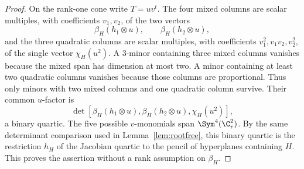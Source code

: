 \begin{proof}
On the rank-one cone write \(T=uv^t\).  The four mixed columns are
scalar multiples, with coefficients \(v_1,v_2\), of the two vectors
\[
 \beta_H(h_1\otimes u),\qquad
 \beta_H(h_2\otimes u),
\]
and the three quadratic columns are scalar multiples, with
coefficients \(v_1^2,v_1v_2,v_2^2\), of the single vector
\(\chi_H(u^2)\).  A \(3\)-minor containing three mixed columns
vanishes because the mixed span has dimension at most two.  A minor
containing at least two quadratic columns vanishes because those
columns are proportional.  Thus only minors with two mixed columns
and one quadratic column survive.  Their common \(u\)-factor is
\[
 \det[
   \beta_H(h_1\otimes u),
   \beta_H(h_2\otimes u),
   \chi_H(u^2)
 ],
\]
a binary quartic.  The five possible \(v\)-monomials span
\(\Sym^4(\C^2_v)\).  By the same determinant comparison used in
Lemma~\ref{lem:rootfree}, this binary quartic is the restriction
\(h_H\) of the Jacobian quartic to the pencil of hyperplanes
containing \(H\).  This proves the assertion without a rank
assumption on \(\beta_H\).
\end{proof}

